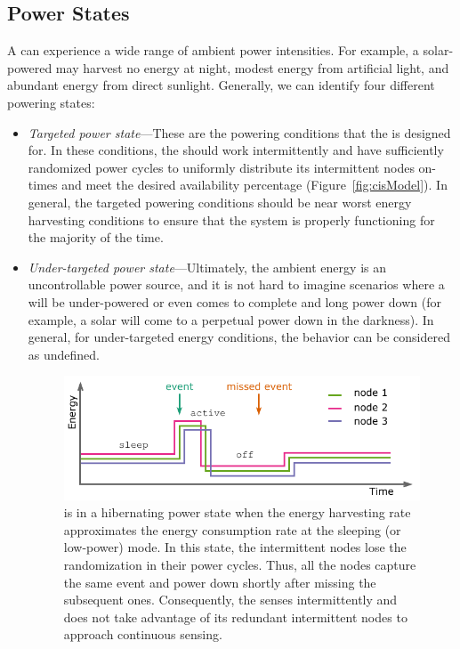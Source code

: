 \subsection{Power States}
\label{sec:power_state}
A \sys can experience a wide range of ambient power intensities. For example, a solar-powered \sys may harvest no energy at night, modest energy from artificial light, and abundant energy from direct sunlight.  Generally, we can identify four different \sys powering states: 
\begin{itemize}
		\item \textit{Targeted power state}---These are the powering conditions that the \sys is designed for. In these  conditions, the \sys should work intermittently and have sufficiently randomized power cycles to uniformly distribute its intermittent nodes on-times and meet the desired availability percentage (Figure~\ref{fig:cisModel}). In general, the targeted powering conditions should be near worst energy harvesting conditions to ensure that the system is properly functioning for the majority of the time.
		\item \textit{Under-targeted power state}---Ultimately, the ambient energy is an uncontrollable power source, and it is not hard to imagine scenarios where a \sys will be under-powered or even comes to complete and long power down (for example, a solar \sys will come to a perpetual power down in the darkness). In general, for under-targeted energy conditions, the \sys behavior can be considered as undefined.
%
\begin{figure}
		\centering
		\includegraphics[width=\columnwidth]{figures/hibernating_power_state}
		\caption{\fullsys is in a hibernating power state when the energy harvesting rate approximates the energy consumption rate at the sleeping (or low-power) mode. In this state, the intermittent nodes lose the randomization in their power cycles. Thus, all the nodes capture the same event and power down shortly after missing the subsequent ones. Consequently, the \sys senses intermittently and does not take advantage of its redundant intermittent nodes to approach continuous sensing.}

\end{figure}
\end{itemize}
